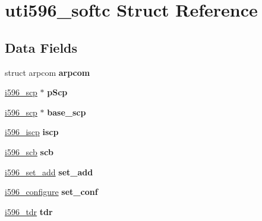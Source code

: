 \hypertarget{structuti596__softc}{}\section{uti596\+\_\+softc Struct Reference}
\label{structuti596__softc}
\subsection*{Data Fields}
\begin{DoxyCompactItemize}
\item 
\mbox{\label{structuti596__softc_abda708810bebcd96cf202ff329f7c31a}} 
struct arpcom {\bfseries arpcom}
\item 
\mbox{\label{structuti596__softc_aa13ea5d9af8f8d3a61492efdd9568dfe}} 
\mbox{\hyperlink{structi596__scp}{i596\+\_\+scp}} $\ast$ {\bfseries p\+Scp}
\item 
\mbox{\label{structuti596__softc_a550c766a285cf24dc5d8fca98d172a7d}} 
\mbox{\hyperlink{structi596__scp}{i596\+\_\+scp}} $\ast$ {\bfseries base\+\_\+scp}
\item 
\mbox{\label{structuti596__softc_a3c636a2e09cb5ea5c816bf432a0e108c}} 
\mbox{\hyperlink{structi596__iscp}{i596\+\_\+iscp}} {\bfseries iscp}
\item 
\mbox{\label{structuti596__softc_ab9653cc6d67e974d8937460dae9a0715}} 
\mbox{\hyperlink{structi596__scb}{i596\+\_\+scb}} {\bfseries scb}
\item 
\mbox{\label{structuti596__softc_ad9513ec5cf394ef18b52f1de90108439}} 
\mbox{\hyperlink{structi596__set__add}{i596\+\_\+set\+\_\+add}} {\bfseries set\+\_\+add}
\item 
\mbox{\label{structuti596__softc_aeea2699c4979e57a9648008941a2c451}} 
\mbox{\hyperlink{structi596__configure}{i596\+\_\+configure}} {\bfseries set\+\_\+conf}
\item 
\mbox{\label{structuti596__softc_a6d7293595d5498f791e074c41a2706ef}} 
\mbox{\hyperlink{structi596__tdr}{i596\+\_\+tdr}} {\bfseries tdr}

\end{DoxyCompactItemize}

